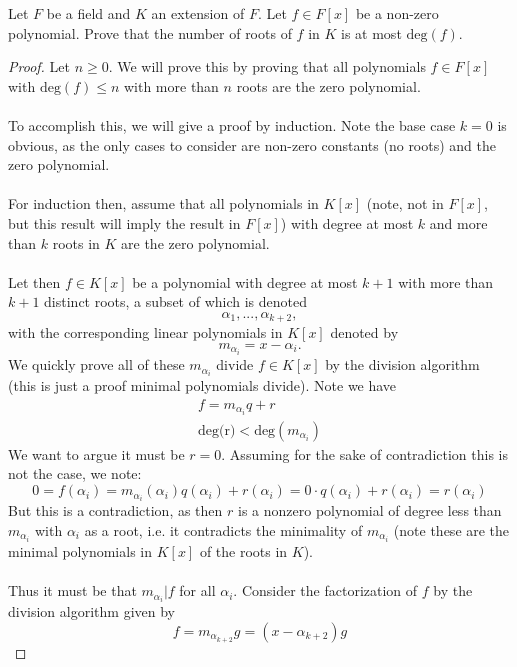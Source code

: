 \documentclass[12pt]{article}
\newenvironment{ex}[2][Exercise]{\begin{trivlist}
\item[\hskip \labelsep {\bfseries #1}\hskip \labelsep {\bfseries #2.}]}{\end{trivlist}}
\begin{document}
\begin{ex}{2}
    Let $F$ be a field and $K$ an extension of $F$. Let $f \in F[x]$ be a non-zero polynomial. Prove that the number of roots of $f$ in $K$ is at most $\text{deg}(f)$.
    \begin{proof}
        Let $n \geq 0$. We will prove this by proving that all polynomials $f \in F[x]$ with $\text{deg}(f) \leq n$ with more than $n$ roots are the zero polynomial. \\ \\
        To accomplish this, we will give a proof by induction. Note the base case $k = 0$ is obvious, as the only cases to consider are non-zero constants (no roots) and the zero polynomial. \\ \\
        For induction then, assume that all polynomials in $K[x]$ (note, not in $F[x]$, but this result will imply the result in $F[x]$) with degree at most $k$ and more than $k$ roots in $K$ are the zero polynomial. \\ \\
        Let then $f \in K[x]$ be a polynomial with degree at most $k + 1$ with more than $k + 1$ distinct roots, a subset of which is denoted
        $$\alpha_1, ..., \alpha_{k + 2},$$
        with the corresponding linear polynomials in $K[x]$ denoted by 
        $$m_{\alpha_i} = x - \alpha_i.$$
        We quickly prove all of these $m_{\alpha_i}$ divide $f \in K[x]$ by the division algorithm (this is just a proof minimal polynomials divide). Note we have
        \begin{align*}
            f = m_{\alpha_i}q + r \\
            \text{deg(r)} < \text{deg}(m_{\alpha_i})
        \end{align*}
        We want to argue it must be $r = 0$. Assuming for the sake of contradiction this is not the case, we note:
        $$0 = f(\alpha_i) = m_{\alpha_i}(\alpha_i)q(\alpha_i) + r(\alpha_i) = 0\cdot q(\alpha_i) + r(\alpha_i) = r(\alpha_i)$$
        But this is a contradiction, as then $r$ is a nonzero polynomial of degree less than $m_{\alpha_i}$ with $\alpha_i$ as a root, i.e. it contradicts the minimality of $m_{\alpha_i}$ (note these are the minimal polynomials in $K[x]$ of the roots in $K$). \\ \\
        Thus it must be that $m_{\alpha_i} | f$ for all ${\alpha_i}$. Consider the factorization of $f$ by the division algorithm given by 
        $$f = m_{\alpha_{k + 2}}g = (x- \alpha_{k + 2})g$$

\end{proof}
\end{ex}
\end{document}
